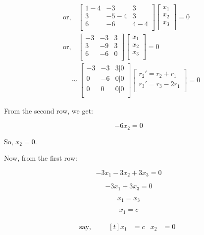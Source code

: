 \documentclass{article}
\begin{document}
\begin{align*}
    &\text{or,} \quad 
    \begin{bmatrix}
        1-4 & -3 & 3 \\
        3 & -5-4 & 3  \\
        6 & -6 & 4-4\\
    \end{bmatrix}
    \begin{bmatrix}
        x_1\\
        x_2\\
        x_3\\
    \end{bmatrix}
    = 0 \\
    &\text{or,} \quad 
    \begin{bmatrix}
        -3 & -3 & 3 \\
        3 & -9 & 3  \\
        6 & -6 & 0\\
    \end{bmatrix}
    \begin{bmatrix}
        x_1\\
        x_2\\
        x_3\\
    \end{bmatrix}
    = 0 \\
    &\text{} \quad 
    \sim\begin{bmatrix}
        -3 & -3 & 3 |0\\
        0 & -6 & 0  |0\\
        0 & 0 & 0  |0\\
    \end{bmatrix}
    \begin{bmatrix}
        r_2' = r_2 + r_1\\
        r_3' = r_3 - 2r_1\\
    \end{bmatrix}
    = 0
\end{align*}

From the second row, we get:

\[ -6x_2 = 0 \]

So, \( x_2 = 0 \).

Now, from the first row:

\[ -3x_1 - 3x_2 + 3x_3 = 0 \]

\[ -3x_1 + 3x_3 = 0 \]

\[ x_1 = x_3 \]

\[ x_1 = c \]

\begin{align*}
    \text{say, } \quad & \begin{aligned}[t]
        x_1 &= c &
        x_2 &= 0
    \end{aligned}
\end{align*}
\end{document}
